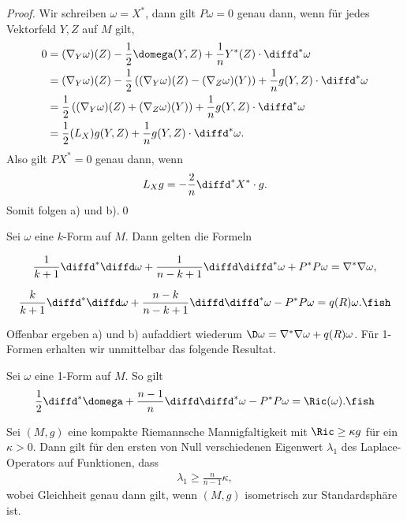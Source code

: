 \documentclass[%
	paper=a5,%
	fleqn,%
	DIV=18,%
	BCOR=0mm,
	fontsize=11pt,
	titlepage=false,%
	bibliography=totoc,
	DIV=18,%
	twoside=true,
	pdftitle=Riemannsche Geometrie,
	pdfauthor=Uwe Semmelmann,
	numbers=noendperiod]%
	{scrbook}
\begin{document}
\begin{proof}
Wir schreiben $\omega = X^*$, dann gilt $P\omega = 0$ genau dann, wenn für jedes Vektorfeld $Y,Z$ auf $M$ gilt,
\begin{align*}
0 &=  (\nabla_{Y}\omega)(Z) - \frac{1}{2}\domega(Y,Z) + \frac{1}{n} Y^*(Z) \cdot \diffd^*\omega\\
&= (\nabla_{Y}\omega)(Z) - \frac{1}{2}\left( (\nabla_{Y}\omega)(Z) - (\nabla_{Z}\omega)(Y) \right) + \frac{1}{n} g(Y,Z) \cdot \diffd^*\omega\\
&= \frac{1}{2}\left( (\nabla_{Y}\omega)(Z) + (\nabla_{Z}\omega)(Y) \right) + \frac{1}{n} g(Y,Z) \cdot \diffd^*\omega\\
&= \frac{1}{2}(L_{X})g(Y,Z) + \frac{1}{n} g(Y,Z) \cdot \diffd^*\omega.
\end{align*}
Also gilt $PX^* = 0$ genau dann, wenn
\begin{align*}
L_{X}g = -\frac{2}{n}\diffd^*X^*\cdot g.
\end{align*}
Somit folgen a) und b).\qed
\end{proof}

\begin{prop}
Sei $\omega$ eine $k$-Form auf $M$. Dann gelten die Formeln
\begin{propenum}
\item 
\[
\frac{1}{k+1}\diffd^*\diffd\omega + \frac{1}{n-k+1}\diffd\diffd^*\omega + P^*P\omega = \nabla^*\nabla\omega,
\]
\item 
\[
\frac{k}{k+1}\diffd^*\diffd\omega + \frac{n-k}{n-k+1}\diffd\diffd^*\omega - P^*P\omega = q(R)\omega.\fish
\]
\end{propenum}
\end{prop}
Offenbar ergeben a) und b) aufaddiert wiederum $\D\omega = \nabla^*\nabla\omega + q(R)\omega$. Für 1-Formen erhalten wir unmittelbar das folgende Resultat.

\begin{cor}
Sei $\omega$ eine 1-Form auf $M$. So gilt
\begin{align*}
\frac{1}{2}\diffd^*\domega + \frac{n-1}{n}\diffd\diffd^*\omega - P^*P\omega = \Ric(\omega).\fish
\end{align*}
\end{cor}

\begin{cor}
Sei $(M,g)$ eine kompakte Riemannsche Mannigfaltigkeit mit $\Ric \ge \kappa g$ für ein $\kappa > 0$. Dann gilt für den ersten von Null verschiedenen Eigenwert $\lambda_{1}$ des Laplace-Operators auf Funktionen, dass
\begin{align*}
\lambda_{1} \ge \frac{n}{n-1}\kappa,
\end{align*}
wobei Gleichheit genau dann gilt, wenn $(M,g)$ isometrisch zur Standardsphäre ist.~\fish
\end{cor}
\end{document}
